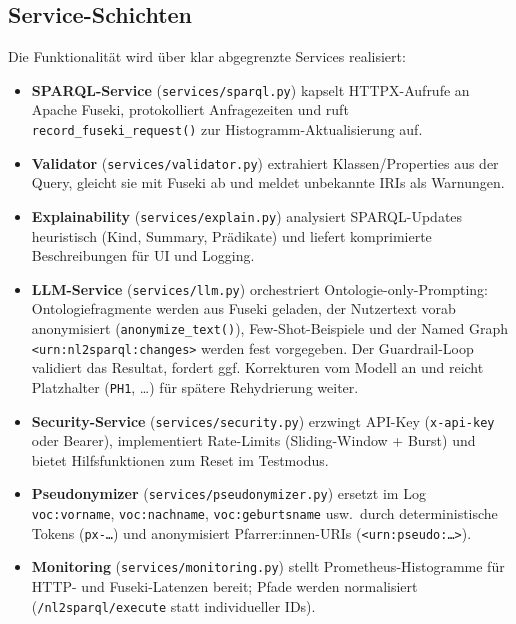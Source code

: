 \subsection{Service-Schichten}
Die Funktionalität wird über klar abgegrenzte Services realisiert:
\begin{itemize}
  \item \textbf{SPARQL-Service} (\texttt{services/sparql.py}) kapselt HTTPX-Aufrufe an Apache Fuseki, protokolliert Anfragezeiten und ruft \texttt{record\_fuseki\_request()} zur Histogramm-Aktualisierung auf.
  \item \textbf{Validator} (\texttt{services/validator.py}) extrahiert Klassen/Properties aus der Query, gleicht sie mit Fuseki ab und meldet unbekannte IRIs als Warnungen.
  \item \textbf{Explainability} (\texttt{services/explain.py}) analysiert SPARQL-Updates heuristisch (Kind, Summary, Prädikate) und liefert komprimierte Beschreibungen für UI und Logging.
  \item \textbf{LLM-Service} (\texttt{services/llm.py}) orchestriert Ontologie-only-Prompting: Ontologiefragmente werden aus Fuseki geladen, der Nutzertext vorab anonymisiert (\texttt{anonymize\_text()}), Few-Shot-Beispiele und der Named Graph \texttt{<urn:nl2sparql:changes>} werden fest vorgegeben. Der Guardrail-Loop validiert das Resultat, fordert ggf. Korrekturen vom Modell an und reicht Platzhalter (\texttt{PH1}, …) für spätere Rehydrierung weiter.
  \item \textbf{Security-Service} (\texttt{services/security.py}) erzwingt API-Key (\texttt{x-api-key} oder Bearer), implementiert Rate-Limits (Sliding-Window + Burst) und bietet Hilfsfunktionen zum Reset im Testmodus.
  \item \textbf{Pseudonymizer} (\texttt{services/pseudonymizer.py}) ersetzt im Log \texttt{voc:vorname}, \texttt{voc:nachname}, \texttt{voc:geburtsname} usw.\ durch deterministische Tokens (\texttt{px-\ldots}) und anonymisiert Pfarrer:innen-URIs (\texttt{<urn:pseudo:\ldots>}).
  \item \textbf{Monitoring} (\texttt{services/monitoring.py}) stellt Prometheus-Histogramme für HTTP- und Fuseki-Latenzen bereit; Pfade werden normalisiert (\texttt{/nl2sparql/execute} statt individueller IDs).
\end{itemize}

